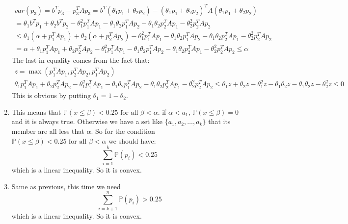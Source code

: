 \documentclass[a4paper]{article}
\begin{document}
\begin{latin}
\begin{enumerate}
\begin{gather*}
		\\
		var(p_{3}) = b^{T}p_{3} - p_{3}^{T} A p_{3} = b^{T}(\theta_{1}p_{1} + \theta_{2}p_{2}) - (\theta_{1}p_{1} + \theta_{2}p_{2})^{T} A (\theta_{1}p_{1} + \theta_{2}p_{2}) 
		\\
		= \theta_{1} b^{T}p_{1} + \theta_{2} b^{T}p_{2} - \theta_{1}^{2} p_{1}^{T}Ap_{1} - \theta_{1} \theta_{2} p_{1}^{T}Ap_{2} - \theta_{1} \theta_{2} p_{2}^{T}Ap_{1} - \theta_{2}^{2} p_{2}^{T}Ap_{2}
		\\
		\leq \theta_{1} (\alpha + p_{1}^{T}Ap_{1}) + \theta_{2} (\alpha + p_{2}^{T}Ap_{2}) - \theta_{1}^{2} p_{1}^{T}Ap_{1} - \theta_{1} \theta_{2} p_{1}^{T}Ap_{2} - \theta_{1} \theta_{2} p_{2}^{T}Ap_{1} - \theta_{2}^{2} p_{2}^{T}Ap_{2} 
		\\
		= \alpha + \theta_{1} p_{1}^{T}Ap_{1} + \theta_{2} p_{2}^{T}Ap_{2} - \theta_{1}^{2} p_{1}^{T}Ap_{1} - \theta_{1} \theta_{2} p_{1}^{T}Ap_{2} - \theta_{1} \theta_{2} p_{2}^{T}Ap_{1} - \theta_{2}^{2} p_{2}^{T}Ap_{2} \leq \alpha
		\end{gather*}
	The last in equality comes from the fact that:
	\begin{gather*}
		z = \max(p_{1}^{T}Ap_{1}, p_{2}^{T}Ap_{2}, p_{1}^{T}Ap_{2})
		\\
		\theta_{1} p_{1}^{T}Ap_{1} + \theta_{2} p_{2}^{T}Ap_{2} - \theta_{1}^{2} p_{1}^{T}Ap_{1} - \theta_{1} \theta_{2} p_{1}^{T}Ap_{2} - \theta_{1} \theta_{2} p_{2}^{T}Ap_{1} - \theta_{2}^{2} p_{2}^{T}Ap_{2} \leq \theta_{1} z + \theta_{2} z - \theta_{1}^{2} z - \theta_{1} \theta_{2} z - \theta_{1} \theta_{2} z - \theta_{2}^{2} z \leq 0
	\end{gather*}
	This is obvious by putting $ \theta_{1} = 1 - \theta_{2} $.
	\item This means that $ \mathbb{P}(x \leq \beta) < 0.25 \text{ for all } \beta < \alpha $. if $ \alpha < a_{1} $, $ \mathbb{P}(x \leq \beta) = 0 $ and it is always true. Otherwise we have a set like $ \{ a_{1}, a_{2}, \dots, a_{k} \}$ that its member are all less that $ \alpha $. So for the condition $ \mathbb{P}(x \leq \beta) < 0.25 \text{ for all } \beta < \alpha $ we should have:
	\begin{equation*}
		\sum_{i=1}^{k} \mathbb{P}(p_{i}) < 0.25
	\end{equation*}
	which is a linear inequality. So it is convex.
	\item Same as previous, this time we need
	\begin{equation*}
		\sum_{i=k+1}^{n} \mathbb{P}(p_{i}) > 0.25
	\end{equation*}
	which is a linear inequality. So it is convex.
\end{enumerate}

\end{latin}
\end{document}

